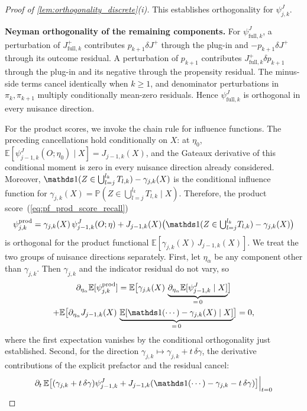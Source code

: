 \begin{proof}[Proof of \cref{lem:orthogonality_discrete}\textup{(i)}]
This establishes orthogonality for $\psi_{j,k}^J$.

\medskip
\noindent\textbf{Neyman orthogonality of the remaining components.}
For $\psi_{\mathrm{full},k}^J$, a perturbation of $J_{\mathrm{full},k}^+$ contributes $p_{k+1}\delta J^+$ through the plug-in and $-p_{k+1}\delta J^+$ through its outcome residual. A perturbation of $p_{k+1}$ contributes $J_{\mathrm{full},k}^+\delta p_{k+1}$ through the plug-in and its negative through the propensity residual. The minus-side terms cancel identically when $k\geqslant1$, and denominator perturbations in $\pi_k,\pi_{k+1}$ multiply conditionally mean-zero residuals. Hence $\psi_{\mathrm{full},k}^J$ is orthogonal in every nuisance direction.

For the product scores, we invoke the chain rule for influence functions. The preceding cancellations hold conditionally on $X$: at $\eta_0$, $\mathbb E[\psi_{j-1,k}^J(O;\eta_0)\mid X]=J_{j-1,k}(X)$, and the Gateaux derivative of this conditional moment is zero in every nuisance direction already considered. Moreover, $\indicator(Z \in \bigcup_{l=j}^{l_k} T_{l,k}) - \gamma_{j,k}(X)$ is the conditional influence function for $\gamma_{j,k}(X) = \mathbb{P}(Z \in \bigcup_{l=j}^{l_k} T_{l,k} \mid X)$. Therefore, the product score~(\ref{eq:pf_prod_score_recall})
\[
    \psi_{j,k}^{\mathrm{prod}} = \gamma_{j,k}(X)\,\psi_{j-1,k}^J(O;\eta) + J_{j-1,k}(X)\bigl(\indicator(Z \in {\textstyle\bigcup_{l=j}^{l_k}} T_{l,k}) - \gamma_{j,k}(X)\bigr)
\]
is orthogonal for the product functional $\mathbb{E}[\gamma_{j,k}(X)\,J_{j-1,k}(X)]$. We treat the two groups of nuisance directions separately. First, let $\eta_\alpha$ be any component other than $\gamma_{j,k}$. Then $\gamma_{j,k}$ and the indicator residual do not vary, so
\begin{multline*}
    \partial_{\eta_\alpha}\mathbb{E}[\psi_{j,k}^{\mathrm{prod}}] = \mathbb{E}\bigl[\gamma_{j,k}(X)\,\underbrace{\partial_{\eta_\alpha}\mathbb{E}[\psi_{j-1,k}^J \mid X]}_{=\,0}\bigr] \\
    + \mathbb{E}\bigl[\partial_{\eta_\alpha}J_{j-1,k}(X)\,\underbrace{\mathbb{E}[\indicator(\cdots) - \gamma_{j,k}(X) \mid X]}_{=\,0}\bigr] = 0,
\end{multline*}
where the first expectation vanishes by the conditional orthogonality just established. Second, for the direction $\gamma_{j,k} \mapsto \gamma_{j,k} + t\,\delta\gamma$, the derivative contributions of the explicit prefactor and the residual cancel:
\[
    \partial_t\,\mathbb{E}\bigl[(\gamma_{j,k}+t\,\delta\gamma)\psi_{j-1,k}^J + J_{j-1,k}(\indicator(\cdots) - \gamma_{j,k} - t\,\delta\gamma)\bigr]\Big|_{t=0}
\]
\end{proof}
